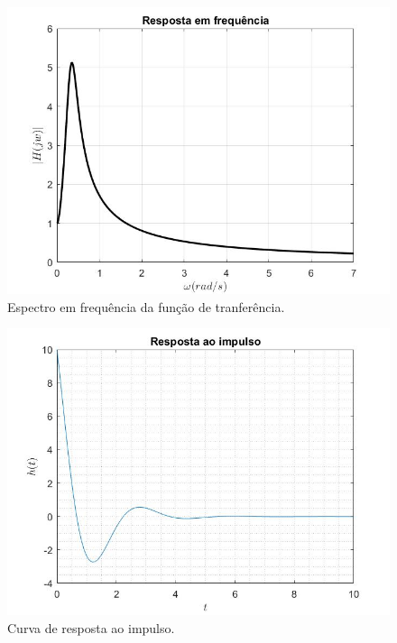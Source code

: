 \documentclass[a4paper,12pt,oneside,openany,table,xcdraw]{article}
\begin{document}
\vspace{0.2cm}
\begin{figure}[H]
\centering
\includegraphics[width=14cm]{ex3-Hjw}
\caption{Espectro em frequência da função de tranferência.}
\label{ex3:Hjw}
\end{figure}

\vspace{0.2cm}
\begin{figure}[H]
\centering
\includegraphics[width=14cm]{ex3-ht}
\caption{Curva de resposta ao impulso.}
\label{ex3:ht}
\end{figure}
\end{document}
